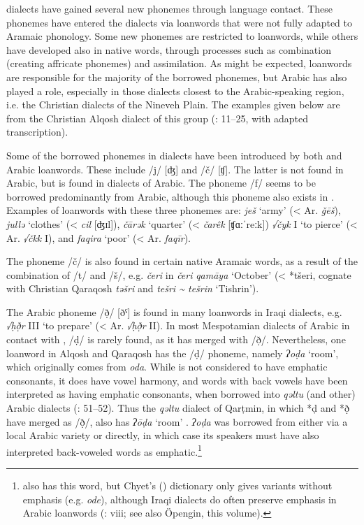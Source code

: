 \documentclass[output=paper]{langsci/langscibook}
\begin{document}
 dialects have gained several new phonemes through language contact. These phonemes have entered the dialects via {loanwords} that were not fully adapted to Aramaic phonology. Some new phonemes are restricted to {loanwords}, while others have developed also in native words, through processes such as combination (creating affricate phonemes) and assimilation. As might be expected,  {loanwords} are responsible for the majority of the borrowed phonemes, but Arabic has also played a role, especially in those dialects closest to the Arabic-speaking region, i.e. the Christian dialects of the Nineveh Plain. The examples given below are from the Christian Alqosh dialect of this group (\citealt{Coghill2004}: 11–25, with adapted transcription).

Some of the borrowed phonemes in  dialects have been introduced by both  and Arabic {loanwords}. These include /j/ [ʤ] and /č/ [ʧ]. The latter is not found in  Arabic, but is found in  dialects of Arabic. The {phoneme} /f/ seems to be borrowed predominantly from Arabic, although this {phoneme} also exists in . Examples of {loanwords} with these three phonemes are: \textit{ješ} ‘army’ (<  Ar. \textit{ǧēš}), \textit{jullə} ‘clothes’ (<  \textit{cil} [ʤɪl]), \textit{čārək} ‘quarter’ (<  \textit{čarêk} [ʧɑːˈreːk]) \textit{√čyk} I ‘to pierce’ (<  Ar. \textit{√čkk} I), and \textit{faqira} ‘poor’ (< Ar. \textit{faqīr}).

The {phoneme} /č/ is also found in certain native Aramaic words, as a result of the combination of /t/ and /š/, e.g. \textit{čeri} in \textit{čeri} \textit{qamāya} ‘October’ (< *tšeri, {cognate} with Christian Qaraqosh \textit{təšri} and  \textit{tešri {\textasciitilde} tešrin} ‘Tishrin’).

The Arabic {phoneme} /ð̣/ [ðˤ] is found in many {loanwords} in Iraqi  dialects, e.g. \textit{√ḥð̣r} III ‘to prepare’ (<  Ar. \textit{√ḥð̣r} II). In most Mespotamian dialects of Arabic in contact with , /ḍ/ is rarely found, as it has {merged} with /ð̣/. Nevertheless, one {loanword} in Alqosh and Qaraqosh has the /ḍ/ {phoneme}, namely \textit{ʔoḍa} ‘room’, which originally comes from  \textit{oda}. While  is not considered to have {emphatic consonants}, it does have vowel harmony, and words with back vowels have been interpreted as having {emphatic consonants}, when borrowed into \textit{qəltu} (and other) Arabic dialects (\citealt{Jastrow1978}: 51–52). Thus the \textit{qəltu} dialect of Qarṭmin, in which *ḍ and *ð̣ have {merged} as /ð̣/, also has \textit{ʔōḍa} ‘room’ \citep[70]{Jastrow1978}.  \textit{ʔoḍa} was borrowed from  either via a local Arabic variety or directly, in which case its speakers must have also interpreted back-voweled  words as {emphatic}.\footnote{ also has this word, but Chyet's (\citeyear{Chyet2003}) dictionary only gives variants without {emphasis} (e.g. \textit{ode}), although Iraqi  dialects do often preserve {emphasis} in Arabic {loanwords} (\citealt{Chyet2003}: viii; see also Öpengin, this volume).}
\end{document}
